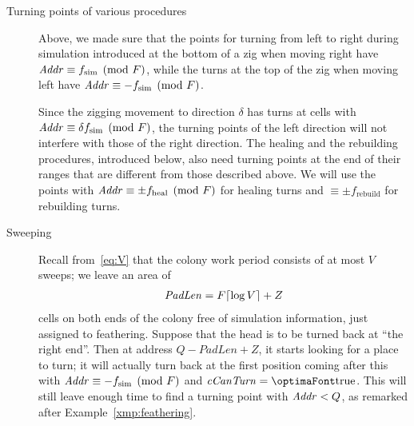 \documentclass[12pt]{memoir}
\newcommand{\fld}[1]{\ensuremath{\textit{#1\/}}}
\newcommand{\tSim}{f_{\mathrm{sim}}}
\newcommand{\tHeal}{f_{\mathrm{heal}}}
\newcommand{\tRebuild}{f_{\mathrm{rebuild}}}
\def\B{B}
\renewcommand{\V}{V}
\newcommand{\F}{F}
\newcommand{\Z}{Z}
\newcommand{\Addr}{\fld{Addr}}
\newcommand{\cCanTurn}{\fld{cCanTurn}}
\newcommand{\PadLen}{\mathit{PadLen}}
\begin{document}
\begin{description}
  \item[Turning points of various procedures]
Above, we made sure that the points for turning from left to right during simulation
introduced at the bottom of a zig when moving right have \( \Addr\equiv \tSim\pmod{\F} \), 
while the turns at the top of the zig when moving left have \( \Addr\equiv -\tSim\pmod{\F} \).

Since the zigging movement to direction \( \delta \) has turns at cells with \(
\Addr\equiv\delta\tSim\pmod{\F} \), the turning points of the left direction
will not interfere with those of the right direction.
The healing and the rebuilding procedures, introduced below,
also need turning points at the end of their ranges that are different from
those described above. 
We will use the points with \( \Addr\equiv \pm\tHeal\pmod{\F} \) 
for healing turns and \( \equiv \pm\tRebuild \) for rebuilding turns.

  \item[Sweeping]
Recall from~\eqref{eq:V} that the colony work period consists of at most \( \V \) sweeps;
we leave an area of
\begin{align}\label{eq:PadLenDef}
 \PadLen = \F\cei{\log\V}+\Z %
 \end{align} cells on both ends of the colony free of simulation information,
just assigned to feathering.
Suppose that the head is to be turned back at ``the right end''.
Then at address \( Q-\PadLen+\Z \), it starts looking for a place to turn;
it will actually turn back at the first position coming after this
with \( \Addr\equiv -\tSim \pmod{\F} \) and \( \cCanTurn=\true \).
This will still leave enough time to find a turning point with \( \Addr<Q \), 
as remarked after Example~\ref{xmp:feathering}.
\end{description}



\end{document}

